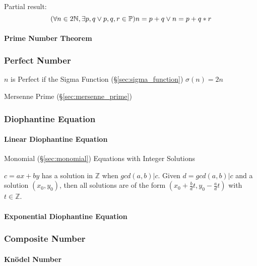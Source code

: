 Partial result:
\[
  (\forall n \in 2\mathbb{N}, \exists p,q \vee p,q,r \in \mathbb{P})
  n = p + q \vee n = p + q * r
\]



\paragraph{Prime Number Theorem}\label{sec:prime_number_theorem}\hfill



\subsubsection{Perfect Number}\label{sec:perfect_number}

$n$ is Perfect if the Sigma Function (\S\ref{sec:sigma_function})
$\sigma(n) = 2n$

Mersenne Prime (\S\ref{sec:mersenne_prime})



\subsubsection{Diophantine Equation}\label{sec:diophantine_equation}

\paragraph{Linear Diophantine Equation}\hfill
\label{sec:linear_diophantine}
Monomial (\S\ref{sec:monomial}) Equations with Integer Solutions

$c = ax + by$ has a solution in $\mathbb{Z}$ when $gcd(a,b)|c$. Given
$d=gcd(a,b)|c$ and a solution $(x_0, y_0)$, then all solutions are of
the form $(x_0 + \frac{b}{d}t, y_0 - \frac{a}{d}t)$ with $t \in
\mathbb{Z}$.



\paragraph{Exponential Diophantine Equation}\hfill
\label{sec:exponential_diophantine}



\subsubsection{Composite Number}\label{sec:composite_number}

\paragraph{Kn\"odel Number}\label{sec:knodel_number}\hfill

